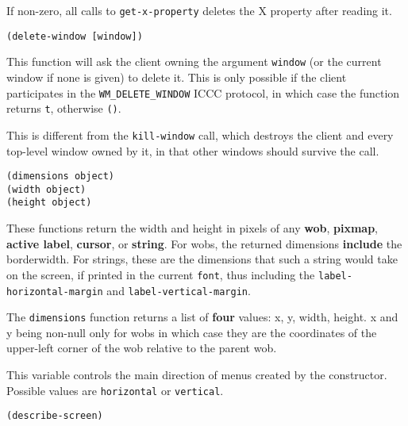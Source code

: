 
If non-zero, all calls to \verb|get-x-property| deletes the X property after
reading it.


{\usagefont\begin{verbatim}
(delete-window [window])
\end{verbatim}}\usageupspace

This function will ask the client owning the argument \verb"window" (or the
current window if none is given) to delete it. This is only possible if the
client participates in the \verb"WM_DELETE_WINDOW" ICCC protocol, in which
case the function returns \verb"t", otherwise \verb"()".

This is different from the \verb"kill-window" call, which destroys the
client and every top-level window owned by it, in that other windows should
survive the call.


{\usagefont\begin{verbatim}
(dimensions object)
(width object)
(height object)
\end{verbatim}}\usageupspace

These functions return the width and height in pixels of any {\bf wob}, {\bf
pixmap}, {\bf active label}, {\bf cursor}, or {\bf string}.  For wobs, the
returned dimensions {\bf include} the borderwidth. For strings, these are the
dimensions that such a string would take on the screen, if printed in the
current {\tt font}, thus including the \verb"label-horizontal-margin" and
\verb"label-vertical-margin".

The \verb"dimensions" function returns a list of {\bf four} values: x, y,
width, height. x and y being non-null only for wobs in which case they are
the coordinates of the upper-left corner of the wob relative to the parent
wob.



This variable controls the main direction of menus created by the
 constructor. Possible values are \verb"horizontal"
or \verb"vertical".

        
{\usagefont\begin{verbatim}
(describe-screen)
\end{verbatim}}\usageupspace

